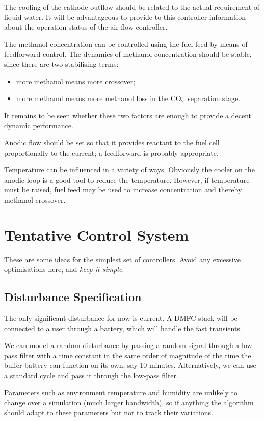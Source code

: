 \documentclass[a4paper,10pt]{article}
\newcommand{\COO}{\ensuremath{\mathrm{CO_2}}}
\begin{document}
The cooling of the cathode outflow should be related to the actual requirement
of liquid water. It will be advantageous to provide to this controller
information about the operation status of the air flow controller.

The methanol concentration can be controlled using the fuel feed by means of
feedforward control. The dynamics of methanol concentration should be stable,
since there are two stabilising terms:
\begin{itemize}
\item more methanol means more crossover;
\item more methanol means more methanol loss in the \COO\ separation stage.
\end{itemize}
It remains to be seen whether these two factors are enough to provide a decent
dynamic performance.

Anodic flow should be set so that it provides reactant to the fuel cell
proportionally to the current; a feedforward is probably appropriate.

Temperature can be influenced in a variety of ways. Obviously the cooler on the
anodic loop is a good tool to reduce the temperature. However, if temperature
must be raised, fuel feed may be used to increase concentration and thereby
methanol crossover.

\pagebreak
\section{Tentative Control System}
These are some ideas for the simplest set of controllers. Avoid any excessive
optimisations here, and \emph{keep it simple}.

\subsection{Disturbance Specification}
The only significant disturbance for now is current. A DMFC stack will be
connected to a user through a battery, which will handle the fast transients.

We can model a random disturbance by passing a random signal through a low-pass
filter with a time constant in the same order of magnitude of the time the
buffer battery can function on its own, say 10 minutes. Alternatively, we can
use a standard cycle and pass it through the low-pass filter.

Parameters such as environment temperature and humidity are unlikely to change
over a simulation (much larger bandwidth), so if anything the algorithm should
adapt to these parameters but not to track their variations.
\end{document}
